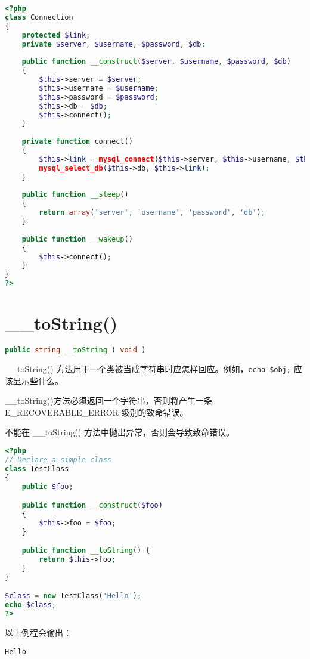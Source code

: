 \begin{lstlisting}[language=PHP]
<?php
class Connection 
{
    protected $link;
    private $server, $username, $password, $db;
    
    public function __construct($server, $username, $password, $db)
    {
        $this->server = $server;
        $this->username = $username;
        $this->password = $password;
        $this->db = $db;
        $this->connect();
    }
    
    private function connect()
    {
        $this->link = mysql_connect($this->server, $this->username, $this->password);
        mysql_select_db($this->db, $this->link);
    }
    
    public function __sleep()
    {
        return array('server', 'username', 'password', 'db');
    }
    
    public function __wakeup()
    {
        $this->connect();
    }
}
?>
\end{lstlisting}

\section{\_\_toString()}


\begin{lstlisting}[language=PHP]
public string __toString ( void )
\end{lstlisting}

\_\_toString() 方法用于一个类被当成字符串时应怎样回应。例如，\texttt{echo \$obj;} 应该显示些什么。

\_\_toString()方法必须返回一个字符串，否则将产生一条 E\_RECOVERABLE\_ERROR 级别的致命错误。

不能在 \_\_toString() 方法中抛出异常，否则会导致致命错误。

\begin{lstlisting}[language=PHP]
<?php
// Declare a simple class
class TestClass
{
    public $foo;

    public function __construct($foo) 
    {
        $this->foo = $foo;
    }

    public function __toString() {
        return $this->foo;
    }
}

$class = new TestClass('Hello');
echo $class;
?>
\end{lstlisting}

以上例程会输出：

\begin{verbatim}
Hello
\end{verbatim}


